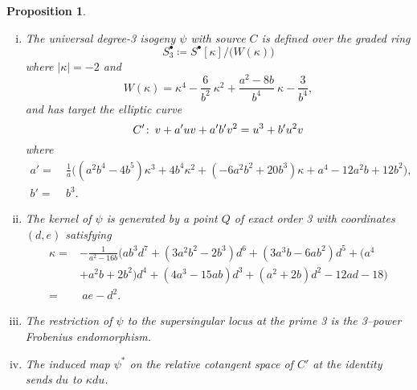 \documentclass[microtype]{gtpart}     %
\newtheorem{prop}{Proposition}[section]
\theoremstyle{remark}
\theoremstyle{definition}
\def\co{\colon\thinspace}
\newcommand{\ce}{\coloneqq}
\newcommand{\K}{\kappa}
\newcommand{\s}{S^\bullet}
\begin{document}
\begin{prop}
\label{prop:isog}
 \mbox{}
 \begin{enumerate}[(i)]
  \item \label{isog(i)} The universal degree-3 isogeny $\psi$ with source $C$ 
  is defined over the graded ring 
  \[
   \s_3 \ce \s [\K] \big/ \big( W(\K) \big) 
  \]
  where $|\K| = -2$ and 
  \begin{equation}
  \label{W}
   W(\K) = \K^4 - \frac{6}{b^2} ~ \K^2 + \frac{a^2 - 8 b}{b^4} ~ \K - \frac{3}{b^4}, 
  \end{equation}
  and has target the elliptic curve 
  \[
   C' \co v + a' u v + a' b' v^2 = u^3 + b' u^2 v 
  \]
  where 
  \begin{equation*}
  \begin{split}
   a' = & ~ \frac{1}{a} \big( (a^2 b^4 - 4 b^5) \K^3 + 4 b^4 \K^2 + (-6 a^2 b^2 + 20 b^3) \K + a^4 - 12 a^2 b + 12 b^2 \big), \\
   b' = & ~ b^3.  
  \end{split}
  \end{equation*}

  \item \label{isog(ii)} The kernel of $\psi$ is generated by a point $Q$ of 
  exact order 3 with coordinates $(d,e)$ satisfying 
  \begin{equation}
  \label{K}
  \begin{split}
   \K = & -\frac{1}{a^2 - 16 b} \big( a b^3 d^7 + (3 a^2 b^2 - 2 b^3) d^6 + (3 a^3 b - 6 a b^2) d^5 + (a^4 \\
        & + a^2 b + 2 b^2) d^4 + (4 a^3 - 15 a b) d^3 + (a^2 + 2 b) d^2 - 12 a d - 18 \big) \\
      = & ~ a e - d^2.  
  \end{split}
  \end{equation}

  \item \label{isog(iii)} The restriction of $\psi$ to the supersingular 
  locus at the prime 3 is the 3--power Frobenius endomorphism.  

  \item \label{isog(iv)} The induced map $\psi^*$ on the relative cotangent 
  space of $C'$ at the identity sends $du$ to $\K du$.  
 \end{enumerate}
\end{prop}
\end{document}
